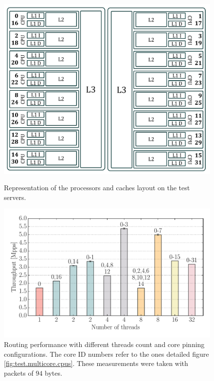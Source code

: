 \documentclass[11pt,a4paper,twoside,titlepage,openany]{book}
\begin{document}
\begin{figure}[t!]
  \centering
  \begin{minipage}{\textwidth}
    \centering
    \includegraphics[width=.7\textwidth]{img/cpus_horiz.pdf}
    \caption[Processors and caches layout on the test servers]{Representation of the processors and caches layout on the test servers.}
    \label{fig:test.multicore.cpus}
  \end{minipage}
  \begin{minipage}{\textwidth}
    \centering
    \includegraphics[width=.85\textwidth]{img/augustus_multithread.pdf}
    \caption[Routing performance with different threads count and core pinning]{Routing performance with different threads count and core pinning configurations. The core ID numbers refer to the ones detailed figure \ref{fig:test.multicore.cpus}. These measurements were taken with packets of $94$ bytes.}
    \label{fig:test.multicore.coremap}
  \end{minipage}
\end{figure}
\end{document}
